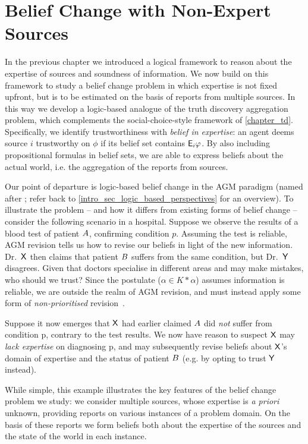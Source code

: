 \chapter{Belief Change with Non-Expert Sources}
\label{chapter_belief_change}

In the previous chapter we introduced a logical framework to reason about the
expertise of sources and soundness of information. We now build on this
framework to study a belief change problem in which expertise is not fixed
upfront, but is to be estimated on the basis of reports from multiple sources.
In this way we develop a logic-based analogue of the truth discovery
aggregation problem, which complements the social-choice-style framework of
\cref{chapter_td}. Specifically, we identify trustworthiness with \emph{belief
in expertise}: an agent deems source $i$ trustworthy on $\phi$ if its belief
set contains $\mathsf{E}_i\varphi$. By also including
propositional formulas in belief sets, we are able to express beliefs about the
actual world, i.e. the aggregation of the reports from sources.

Our point of departure is logic-based belief change in the AGM paradigm (named
after \textcite{alchourron1985logic}; refer back to
\cref{intro_sec_logic_based_perspectives} for an overview).
%
To illustrate the problem -- and how it
differs from existing forms of belief change -- consider the following scenario
in a hospital. Suppose we observe the results of a blood test of patient $A$,
confirming condition $p$. Assuming the test is reliable, AGM revision tells us
how to revise our beliefs in light of the new information. Dr.\ $\mathsf{X}$ then claims
that patient $B$ suffers from the same condition, but Dr.\ $\mathsf{Y}$ disagrees. Given
that doctors specialise in different areas and may make mistakes, who should we
trust?
%
Since the  postulate ($\alpha \in K \ast \alpha$) assumes
information is reliable, we are outside the realm of AGM revision, and must
instead apply some form of \emph{non-prioritised}
revision~\cite{hansson1999survey}.

Suppose it now emerges that $\mathsf{X}$ had earlier claimed $A$ did \emph{not}
suffer from condition p, contrary to the test results. We now have reason to
suspect $\mathsf{X}$ may \emph{lack expertise} on diagnosing p, and may subsequently
revise beliefs about $\mathsf{X}$'s domain of expertise and the status of patient
$B$ (e.g. by opting to trust $\mathsf{Y}$ instead).

While simple, this example illustrates the key features of the belief change
problem we study: we consider multiple sources, whose expertise is \emph{a
priori} unknown, providing reports on various instances of a problem domain. On
the basis of these reports we form beliefs both about the expertise of the
sources and the state of the world in each instance.

